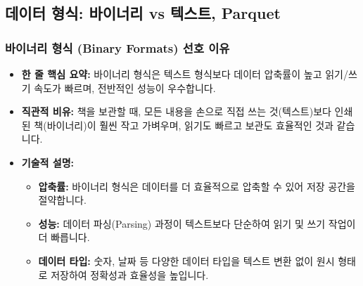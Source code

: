 \documentclass[11pt,a4paper]{article}
\begin{document}
\subsection{데이터 형식: 바이너리 vs 텍스트, Parquet}

\subsubsection{바이너리 형식 (Binary Formats) 선호 이유}
\begin{itemize}
    \item \textbf{한 줄 핵심 요약:} 바이너리 형식은 텍스트 형식보다 데이터 압축률이 높고 읽기/쓰기 속도가 빠르며, 전반적인 성능이 우수합니다.
    \item \textbf{직관적 비유:} 책을 보관할 때, 모든 내용을 손으로 직접 쓰는 것(텍스트)보다 인쇄된 책(바이너리)이 훨씬 작고 가벼우며, 읽기도 빠르고 보관도 효율적인 것과 같습니다.
    \item \textbf{기술적 설명:}
    \begin{itemize}
        \item \textbf{압축률:} 바이너리 형식은 데이터를 더 효율적으로 압축할 수 있어 저장 공간을 절약합니다.
        \item \textbf{성능:} 데이터 파싱(Parsing) 과정이 텍스트보다 단순하여 읽기 및 쓰기 작업이 더 빠릅니다.
        \item \textbf{데이터 타입:} 숫자, 날짜 등 다양한 데이터 타입을 텍스트 변환 없이 원시 형태로 저장하여 정확성과 효율성을 높입니다.
    \end{itemize}
\end{itemize}
\end{document}

